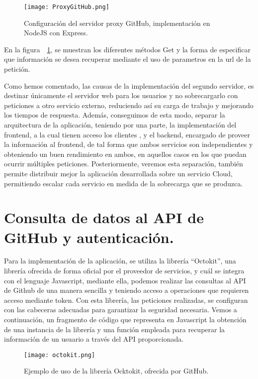\begin{figure}[h!]
  \centerline{\texttt{[image: ProxyGitHub.png]}}
  \caption{Configuración del servidor proxy GitHub, implementación en NodeJS con Express.}
  \label{figure:ProxyGitHub}
\end{figure}
En la figura~~\ref{figure:ProxyGitHub}, se muestran los diferentes métodos Get y la forma de especificar que información se desea recuperar mediante el uso de parametros en la url de la petición.


Como hemos comentado, las causas de la implementación del segundo servidor, es destinar únicamente el servidor web para los usuarios y no sobrecargarlo con peticiones a otro servicio externo, reduciendo así su carga de trabajo y mejorando los tiempos de respuesta. Además, conseguimos de esta modo, separar la arquitectura de la aplicación, teniendo por una parte, la implementación del frontend, a la cual tienen acceso los clientes , y el backend, encargado de proveer la información al frontend, de tal forma que ambos servicios son independientes y obteniendo un buen rendimiento en ambos, en aquellos casos en los que puedan ocurrir múltiples peticiones. Posteriormente, veremos esta separación, también permite distribuir mejor la aplicación desarrollada sobre un servicio Cloud, permitiendo escalar cada servicio en medida de la sobrecarga que se produzca.



\section{Consulta de datos al API de GitHub y autenticación.}

Para la implementación de la aplicación, se utiliza la librería “Octokit”\cite{Octokit,OctokitDoc}, una librería ofrecida de forma oficial por el proveedor de servicios, y cuál se integra con el lenguaje Javascript, mediante ella, podemos realizar las consultas al API de Github de una manera sencilla y teniendo acceso a operaciones que requieren acceso mediante token. Con esta librería, las peticiones realizadas, se configuran con las cabeceras adecuadas para garantizar la seguridad necesaria. Vemos a continuación, un fragmento de código que representa en Javascript la obtención de una instancia de la librería y una función empleada para recuperar la información de un usuario a través del API proporcionada.

\begin{figure}[h!]
  \centerline{\texttt{[image: octokit.png]}}
  \caption{Ejemplo de uso de la librería Ocktokit, ofrecida por GitHub.}
  \label{figure:octokit}
\end{figure}


